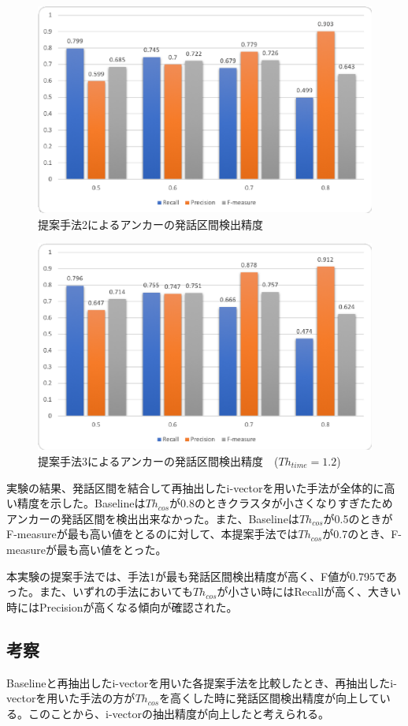 \begin{figure}[H]
  \begin{center}
    \includegraphics[scale=0.8]{./figure/get_anchor_prob2.eps}
  \end{center}
  \caption{提案手法2によるアンカーの発話区間検出精度 \label{fig:result_anchor_prob2}}
\end{figure}

\begin{figure}[H]
  \begin{center}
    \includegraphics[scale=0.8]{./figure/get_anchor_prob3.eps}
  \end{center}
  \caption{提案手法3によるアンカーの発話区間検出精度　($Th_{time}=1.2$) \label{fig:result_anchor_prob3}}
\end{figure}

実験の結果、発話区間を結合して再抽出したi-vectorを用いた手法が全体的に高い精度を示した。Baselineは$Th_{cos}$が0.8のときクラスタが小さくなりすぎたためアンカーの発話区間を検出出来なかった。また、Baselineは$Th_{cos}$が0.5のときがF-measureが最も高い値をとるのに対して、本提案手法では$Th_{cos}$が0.7のとき、F-measureが最も高い値をとった。\par
本実験の提案手法では、手法1が最も発話区間検出精度が高く、F値が0.795であった。また、いずれの手法においても$Th_{cos}$が小さい時にはRecallが高く、大きい時にはPrecisionが高くなる傾向が確認された。

\subsection{考察}
Baselineと再抽出したi-vectorを用いた各提案手法を比較したとき、再抽出したi-vectorを用いた手法の方が$Th_{cos}$を高くした時に発話区間検出精度が向上している。このことから、i-vectorの抽出精度が向上したと考えられる。\par

